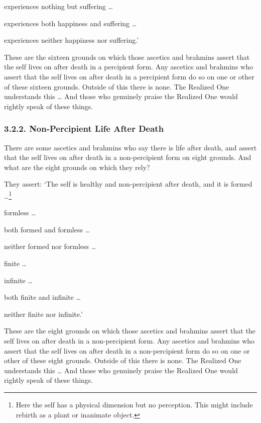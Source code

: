 \documentclass[12pt,openany]{book}%
\begin{document}
experiences nothing but suffering … 

experiences both happiness and suffering … 

experiences neither happiness nor suffering.’ 

These are the sixteen grounds on which those ascetics and brahmins assert that the self lives on after death in a percipient form. Any ascetics and brahmins who assert that the self lives on after death in a percipient form do so on one or other of these sixteen grounds. Outside of this there is none. The Realized One understands this … And those who genuinely praise the Realized One would rightly speak of these things. 

\subsubsection*{3.2.2. Non-Percipient Life After Death }

There are some ascetics and brahmins who say there is life after death, and assert that the self lives on after death in a non-percipient form on eight grounds. And what are the eight grounds on which they rely? 

They assert: ‘The self is healthy and non-percipient after death, and it is formed …\footnote{Here the self has a physical dimension but no perception. This might include rebirth as a plant or inanimate object. } 

formless … 

both formed and formless … 

neither formed nor formless … 

finite … 

infinite … 

both finite and infinite … 

neither finite nor infinite.’ 

These are the eight grounds on which those ascetics and brahmins assert that the self lives on after death in a non-percipient form. Any ascetics and brahmins who assert that the self lives on after death in a non-percipient form do so on one or other of these eight grounds. Outside of this there is none. The Realized One understands this … And those who genuinely praise the Realized One would rightly speak of these things. 
\end{document}
